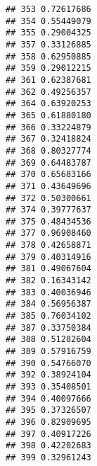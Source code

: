 \documentclass[
]{article}
\newenvironment{Shaded}{\begin{snugshade}}{\end{snugshade}}
\newcommand{\NormalTok}[1]{#1}
\newcommand{\OperatorTok}[1]{\textcolor[rgb]{0.81,0.36,0.00}{\textbf{#1}}}
\begin{document}
\begin{verbatim}
## 353 0.72617686
## 354 0.55449079
## 355 0.29004325
## 357 0.33126885
## 358 0.62950885
## 359 0.29012215
## 361 0.62387681
## 362 0.49256357
## 364 0.63920253
## 365 0.61880180
## 366 0.33224879
## 367 0.32418824
## 368 0.80327774
## 369 0.64483787
## 370 0.65683166
## 371 0.43649696
## 372 0.50300661
## 374 0.39777637
## 375 0.48434536
## 377 0.96908460
## 378 0.42658871
## 379 0.40314916
## 381 0.49067604
## 382 0.16343142
## 383 0.40036946
## 384 0.56956387
## 385 0.76034102
## 387 0.33750384
## 388 0.51282604
## 389 0.57916759
## 390 0.54766070
## 392 0.38924104
## 393 0.35408501
## 394 0.40097666
## 395 0.37326507
## 396 0.82909695
## 397 0.40917226
## 398 0.42202683
## 399 0.32961243
\end{verbatim}

\begin{Shaded}
\end{Shaded}
\end{document}
